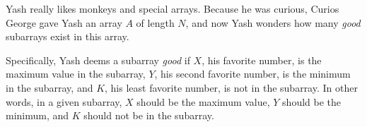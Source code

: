 Yash really likes monkeys and special arrays. Because he was curious, Curios George gave Yash an array $A$ of length $N$, and now Yash wonders how many \textit{good} subarrays exist in this array.

Specifically, Yash deems a subarray \textit{good} if $X$, his favorite number, is the maximum value in the subarray, $Y$, his second favorite number, is the minimum in the subarray, and $K$, his least favorite number, is not in the subarray. In other words, in a given subarray, $X$ should be the maximum value, $Y$ should be the minimum, and $K$ should not be in the subarray.
